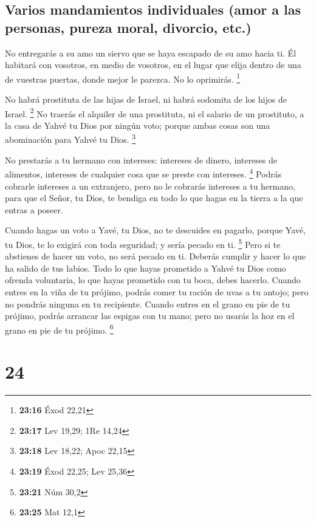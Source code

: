 \hypertarget{varios-mandamientos-individuales-amor-a-las-personas-pureza-moral-divorcio-etc.}{%
\subsection{Varios mandamientos individuales (amor a las personas,
pureza moral, divorcio,
etc.)}\label{varios-mandamientos-individuales-amor-a-las-personas-pureza-moral-divorcio-etc.}}

 No entregarás a su amo un siervo que se haya escapado de
su amo hacia ti.  Él habitará con vosotros, en medio de
vosotros, en el lugar que elija dentro de una de vuestras puertas, donde
mejor le parezca. No lo oprimirás. \footnote{\textbf{23:16} Éxod 22,21}

 No habrá prostituta de las hijas de Israel, ni habrá
sodomita de los hijos de Israel. \footnote{\textbf{23:17} Lev 19,29; 1Re
  14,24}  No traerás el alquiler de una prostituta, ni el
salario de un prostituto, a la casa de Yahvé tu Dios por ningún voto;
porque ambas cosas son una abominación para Yahvé tu Dios. \footnote{\textbf{23:18}
  Lev 18,22; Apoc 22,15}

 No prestarás a tu hermano con intereses: intereses de
dinero, intereses de alimentos, intereses de cualquier cosa que se
preste con intereses. \footnote{\textbf{23:19} Éxod 22,25; Lev 25,36}
 Podrás cobrarle intereses a un extranjero, pero no le
cobrarás intereses a tu hermano, para que el Señor, tu Dios, te bendiga
en todo lo que hagas en la tierra a la que entras a poseer.

 Cuando hagas un voto a Yavé, tu Dios, no te descuides en
pagarlo, porque Yavé, tu Dios, te lo exigirá con toda seguridad; y sería
pecado en ti. \footnote{\textbf{23:21} Núm 30,2}  Pero si
te abstienes de hacer un voto, no será pecado en ti. 
Deberás cumplir y hacer lo que ha salido de tus labios. Todo lo que
hayas prometido a Yahvé tu Dios como ofrenda voluntaria, lo que hayas
prometido con tu boca, debes hacerlo.  Cuando entres en
la viña de tu prójimo, podrás comer tu ración de uvas a tu antojo; pero
no pondrás ninguna en tu recipiente.  Cuando entres en el
grano en pie de tu prójimo, podrás arrancar las espigas con tu mano;
pero no usarás la hoz en el grano en pie de tu prójimo. \footnote{\textbf{23:25}
  Mat 12,1}

\hypertarget{section-23}{%
\section{24}\label{section-23}}

